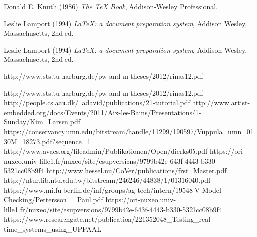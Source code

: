 \documentclass[a4paper,12pt]{article}
\begin{document}
\begin{thebibliography}{9}
Donald E. Knuth (1986) \emph{The \TeX{} Book}, Addison-Wesley Professional.

Leslie Lamport (1994) \emph{\LaTeX: a document preparation system}, Addison
Wesley, Massachusetts, 2nd ed.




Leslie Lamport (1994) \emph{\LaTeX: a document preparation system}, Addison
Wesley, Massachusetts, 2nd ed.



http://www.sts.tu-harburg.de/pw-and-m-theses/2012/rinas12.pdf

http://www.sts.tu-harburg.de/pw-and-m-theses/2012/rinas12.pdf
http://people.cs.aau.dk/~adavid/publications/21-tutorial.pdf
http://www.artist-embedded.org/docs/Events/2011/Aix-les-Bains/Presentations/1-Sunday/Kim_Larsen.pdf
https://conservancy.umn.edu/bitstream/handle/11299/190597/Vuppula_umn_0130M_18273.pdf?sequence=1
http://www.avacs.org/fileadmin/Publikationen/Open/dierks05.pdf
https://ori-nuxeo.univ-lille1.fr/nuxeo/site/esupversions/9799b42e-643f-4443-b330-5321cc08b9f4
http://www.hessel.nu/CoVer/publications/frst_Master.pdf
http://ntur.lib.ntu.edu.tw/bitstream/246246/44838/1/01316040.pdf
https://www.mi.fu-berlin.de/inf/groups/ag-tech/intern/19548-V-Model-Checking/Pettersson__Paul.pdf
https://ori-nuxeo.univ-lille1.fr/nuxeo/site/esupversions/9799b42e-643f-4443-b330-5321cc08b9f4
https://www.researchgate.net/publication/221352048_Testing_real-time_systems_using_UPPAAL


\end{thebibliography}
\end{document}
